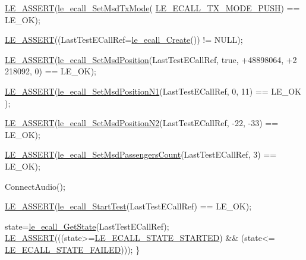\begin{DoxyCodeInclude}
{{{{{{{{    \hyperlink{le__log_8h_ac0dbbef91dc0fed449d0092ff0557b39}{LE\_ASSERT}(\hyperlink{le__ecall__interface_8h_a00d3dbc99884375cf2487d6640767c40}{le\_ecall\_SetMsdTxMode}(
      \hyperlink{le__ecall__interface_8h_adbaa600a7ab66371afddb909b1a113bdafe1cddc2df801a67c7f02020c0dd1127}{LE\_ECALL\_TX\_MODE\_PUSH}) == LE\_OK);

    \hyperlink{le__log_8h_ac0dbbef91dc0fed449d0092ff0557b39}{LE\_ASSERT}((LastTestECallRef=\hyperlink{le__ecall__interface_8h_aad7fa3b34d9d72a2f1d4baa681ba25cc}{le\_ecall\_Create}()) != NULL);

    \hyperlink{le__log_8h_ac0dbbef91dc0fed449d0092ff0557b39}{LE\_ASSERT}(\hyperlink{le__ecall__interface_8h_a2b56b7b7fd7f936c144d30eba7815908}{le\_ecall\_SetMsdPosition}(LastTestECallRef, \textcolor{keyword}{true}, +48898064, +2
      218092, 0) == LE\_OK);

    \hyperlink{le__log_8h_ac0dbbef91dc0fed449d0092ff0557b39}{LE\_ASSERT}(\hyperlink{le__ecall__interface_8h_af3cfea09eea1b1ba39648798070ad139}{le\_ecall\_SetMsdPositionN1}(LastTestECallRef, 0, 11) == LE\_OK
      );

    \hyperlink{le__log_8h_ac0dbbef91dc0fed449d0092ff0557b39}{LE\_ASSERT}(\hyperlink{le__ecall__interface_8h_a6b25b9b242ba114f31ae2f853070bf11}{le\_ecall\_SetMsdPositionN2}(LastTestECallRef, -22, -33) == 
      LE\_OK);

    \hyperlink{le__log_8h_ac0dbbef91dc0fed449d0092ff0557b39}{LE\_ASSERT}(\hyperlink{le__ecall__interface_8h_a8c009bb03d61dcd0ffbd9e986b692a85}{le\_ecall\_SetMsdPassengersCount}(LastTestECallRef, 3) ==
       LE\_OK);

    ConnectAudio();

    \hyperlink{le__log_8h_ac0dbbef91dc0fed449d0092ff0557b39}{LE\_ASSERT}(\hyperlink{le__ecall__interface_8h_aa5d23a1bea370b1ae29fc52d7a89d947}{le\_ecall\_StartTest}(LastTestECallRef) == LE\_OK);

    state=\hyperlink{le__ecall__interface_8h_a7881e794b9249222edde10f76d7663c9}{le\_ecall\_GetState}(LastTestECallRef);
    \hyperlink{le__log_8h_ac0dbbef91dc0fed449d0092ff0557b39}{LE\_ASSERT}(((state>=\hyperlink{le__ecall__interface_8h_a233609e4724e549a1405f9177c0a07dda94ba7aacca9dfe74c4733515a7ba2c5e}{LE\_ECALL\_STATE\_STARTED}) && (state<=
      \hyperlink{le__ecall__interface_8h_a233609e4724e549a1405f9177c0a07dda5275385371c51e441a9eb97626c271b4}{LE\_ECALL\_STATE\_FAILED})));
\}

}}}}}}}}
\end{DoxyCodeInclude}
